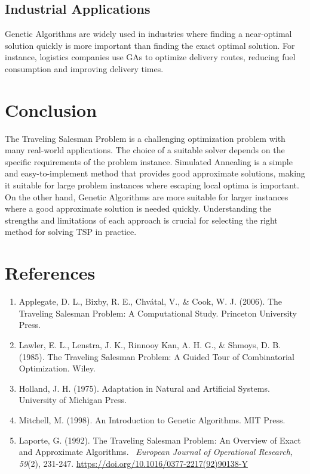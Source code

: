 \documentclass[a4paper,12pt]{report}
\begin{document}
\subsection{Industrial Applications}
Genetic Algorithms are widely used in industries where finding a near-optimal solution quickly is more important than finding the exact optimal solution. For instance, logistics companies use GAs to optimize delivery routes, reducing fuel consumption and improving delivery times.

\section{Conclusion}
The Traveling Salesman Problem is a challenging optimization problem with many real-world applications. The choice of a suitable solver depends on the specific requirements of the problem instance. Simulated Annealing is a simple and easy-to-implement method that provides good approximate solutions, making it suitable for large problem instances where escaping local optima is important. On the other hand, Genetic Algorithms are more suitable for larger instances where a good approximate solution is needed quickly. Understanding the strengths and limitations of each approach is crucial for selecting the right method for solving TSP in practice.

\newpage
\section{References}
\begin{enumerate}
    \item Applegate, D. L., Bixby, R. E., Chvátal, V., & Cook, W. J. (2006). The Traveling Salesman Problem: A Computational Study. Princeton University Press.
    
    \item Lawler, E. L., Lenstra, J. K., Rinnooy Kan, A. H. G., & Shmoys, D. B. (1985). The Traveling Salesman Problem: A Guided Tour of Combinatorial Optimization. Wiley.
    
    \item Holland, J. H. (1975). Adaptation in Natural and Artificial Systems. University of Michigan Press.

    \item Mitchell, M. (1998). An Introduction to Genetic Algorithms. MIT Press.

    \item Laporte, G. (1992). The Traveling Salesman Problem: An Overview of Exact and Approximate Algorithms. \ 	\textit{European Journal of Operational Research, 59}(2), 231-247. \url{https://doi.org/10.1016/0377-2217(92)90138-Y}
\end{enumerate}
\end{document}
